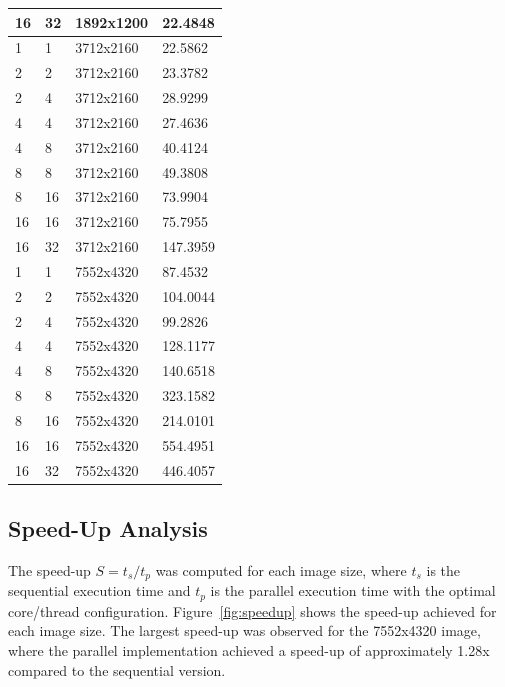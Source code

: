 \documentclass[9pt]{IEEEtran}
\begin{document}
\begin{table}[h]
\begin{tabular}{|l|l|l|l|}
        16 & 32 & 1892x1200 & 22.4848 \\ \hline
        1 & 1 & 3712x2160 & 22.5862 \\ \hline
        2 & 2 & 3712x2160 & 23.3782 \\ \hline
        2 & 4 & 3712x2160 & 28.9299 \\ \hline
        4 & 4 & 3712x2160 & 27.4636 \\ \hline
        4 & 8 & 3712x2160 & 40.4124 \\ \hline
        8 & 8 & 3712x2160 & 49.3808 \\ \hline
        8 & 16 & 3712x2160 & 73.9904 \\ \hline
        16 & 16 & 3712x2160 & 75.7955 \\ \hline
        16 & 32 & 3712x2160 & 147.3959 \\ \hline
        1 & 1 & 7552x4320 & 87.4532 \\ \hline
        2 & 2 & 7552x4320 & 104.0044 \\ \hline
        2 & 4 & 7552x4320 & 99.2826 \\ \hline
        4 & 4 & 7552x4320 & 128.1177 \\ \hline
        4 & 8 & 7552x4320 & 140.6518 \\ \hline
        8 & 8 & 7552x4320 & 323.1582 \\ \hline
        8 & 16 & 7552x4320 & 214.0101 \\ \hline
        16 & 16 & 7552x4320 & 554.4951 \\ \hline
        16 & 32 & 7552x4320 & 446.4057 \\ \hline
    \end{tabular}
\end{table}

\subsection{Speed-Up Analysis}
The speed-up \( S = t_s / t_p \) was computed for each image size, where \( t_s \) is the sequential execution time and \( t_p \) is the parallel execution time with the optimal core/thread configuration. Figure~\ref{fig:speedup} shows the speed-up achieved for each image size. The largest speed-up was observed for the 7552x4320 image, where the parallel implementation achieved a speed-up of approximately 1.28x compared to the sequential version.
\end{document}
